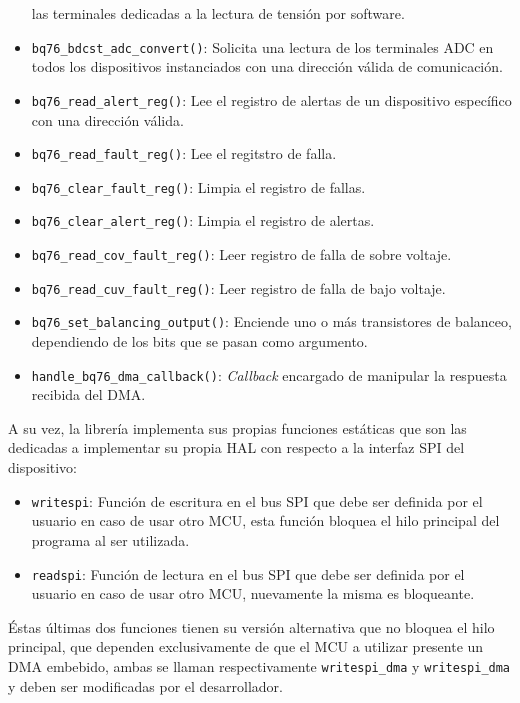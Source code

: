 \documentclass[10pt, a4paper]{report}
\begin{document}
\begin{itemize}
        las terminales dedicadas a la lectura de tensi\'on por software.
    \item \texttt{bq76\_bdcst\_adc\_convert()}: Solicita una lectura de los
        terminales \acrshort{ADC} en todos los dispositivos instanciados con una 
        dirección válida de comunicación.
    \item \texttt{bq76\_read\_alert\_reg()}: Lee el registro de alertas de un
        dispositivo espec\'ifico con una direcci\'on v\'alida.
    \item \texttt{bq76\_read\_fault\_reg()}: Lee el regitstro de falla.
    \item \texttt{bq76\_clear\_fault\_reg()}: Limpia el registro de fallas.
    \item \texttt{bq76\_clear\_alert\_reg()}: Limpia el registro de alertas.
    \item \texttt{bq76\_read\_cov\_fault\_reg()}: Leer registro de falla de sobre
        voltaje.
    \item \texttt{bq76\_read\_cuv\_fault\_reg()}: Leer registro de falla de bajo
        voltaje.
    \item \texttt{bq76\_set\_balancing\_output()}: Enciende uno o m\'as
        transistores de balanceo, dependiendo de los bits que se pasan como
        argumento.
    \item \texttt{handle\_bq76\_dma\_callback()}: \emph{Callback} encargado de
        manipular la respuesta recibida del \acrshort{DMA}.
\end{itemize}

A su vez, la librer\'ia implementa sus propias funciones est\'aticas que son las
dedicadas a implementar su propia \acrshort{HAL} con respecto a la interfaz
\acrshort{SPI} del dispositivo: 

\begin{itemize}
    \item \texttt{writespi}: Funci\'on de escritura en el bus \acrshort{SPI} que
        debe ser definida por el usuario en caso de usar otro \acrshort{MCU},
        esta funci\'on bloquea el hilo principal del programa al ser utilizada.
    \item \texttt{readspi}: Funci\'on de lectura en el bus \acrshort{SPI} que
        debe ser definida por el usuario en caso de usar otro \acrshort{MCU},
        nuevamente la misma es bloqueante.
\end{itemize}

\'Estas \'ultimas dos funciones tienen su versi\'on alternativa que no bloquea
el hilo principal, que dependen exclusivamente de que el \acrshort{MCU} a 
utilizar presente un \acrshort{DMA} embebido, ambas se llaman respectivamente
\texttt{writespi\_dma} y \texttt{writespi\_dma} y deben ser modificadas por el
desarrollador.
\end{document}
